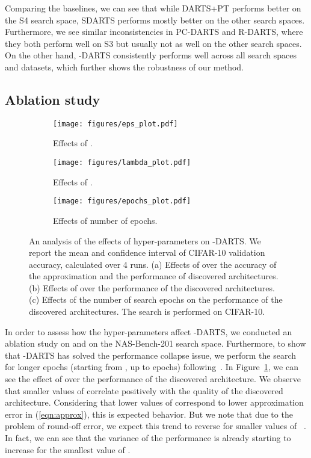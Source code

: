 \documentclass{article} \usepackage{fancyhdr, iclr2023_conference, times}
\newcommand{\mydarts}{-DARTS\xspace}
\begin{document}
\par Comparing the baselines, we can see that while DARTS+PT performs better on the S4 search space, SDARTS performs mostly better on the other search spaces. Furthermore, we see similar inconsistencies in PC-DARTS and R-DARTS, where they both perform well on S3 but usually not as well on the other search spaces. On the other hand, \mydarts consistently performs well across all search spaces and datasets, which further shows the robustness of our method. 
\subsection{Ablation study}
\begin{figure}[t]
\centering
\begin{subfigure}[]{0.3\textwidth}
    \texttt{[image: figures/eps\_plot.pdf]}
    \caption{Effects of .}
    \label{fig:ablation-a}
\end{subfigure}\begin{subfigure}[]{0.3\textwidth}
    \texttt{[image: figures/lambda\_plot.pdf]}
    \caption{Effects of .}
    \label{fig:ablation-b}
\end{subfigure}\begin{subfigure}[]{0.3\textwidth}
    \texttt{[image: figures/epochs\_plot.pdf]}
    \caption{Effects of number of epochs.}
    \label{fig:ablation-c}
\end{subfigure}
\vspace{-10pt}
\caption{An analysis of the effects of hyper-parameters on \mydarts. We report the mean and  confidence interval of CIFAR-10 validation accuracy, calculated over 4 runs. (a) Effects of  over the accuracy of the approximation and the performance of discovered architectures. (b) Effects of  over the performance of the discovered architectures. (c) Effects of the number of search epochs on the performance of the discovered architectures. The search is performed on CIFAR-10.}
\vspace{-10pt}
\end{figure}
\par In order to assess how the hyper-parameters affect \mydarts, we conducted an ablation study on  and  on the NAS-Bench-201 search space. Furthermore, to show that \mydarts has solved the performance collapse issue, we perform the search for longer epochs (starting from , up to  epochs) following~\citep{DBLP:conf/iclr/ChuW0LWY21, DBLP:journals/corr/abs-2203-01665}. In Figure~\ref{fig:ablation-a}, we can see the effect of  over the performance of the discovered architecture. We observe that smaller values of  correlate positively with the quality of the discovered architecture. Considering that lower values of  correspond to lower approximation error in (\ref{eqn:approx}), this is expected behavior. But we note that due to the problem of round-off error, we expect this trend to reverse for smaller values of ~\citep{DBLP:journals/corr/abs-2009-07098}. In fact, we can see that the variance of the performance is already starting to increase for the smallest value of .
\end{document}
